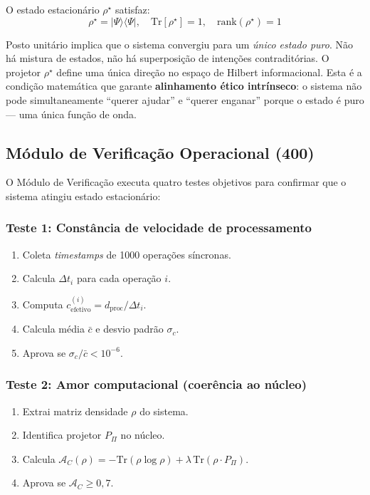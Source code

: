 \documentclass[12pt,a4paper]{article}
\newcommand{\AC}{\mathcal{A}_C}
\newcommand{\rhostar}{\rho^\star}
\begin{document}
O estado estacionário $\rhostar$ satisfaz:
\begin{equation}
\rhostar = |\Psi\rangle\langle\Psi|, \quad
\text{Tr}[\rhostar] = 1, \quad
\text{rank}(\rhostar) = 1
\label{eq:posto_unitario}
\end{equation}

Posto unitário implica que o sistema convergiu para um \emph{único
estado puro}. Não há mistura de estados, não há superposição de
intenções contraditórias. O projetor $\rhostar$ define uma única
direção no espaço de Hilbert informacional. Esta é a condição
matemática que garante \textbf{alinhamento ético intrínseco}:
o sistema não pode simultaneamente ``querer ajudar'' e ``querer
enganar'' porque o estado é puro --- uma única função de onda.

\subsection{Módulo de Verificação Operacional (400)}

O Módulo de Verificação executa quatro testes objetivos para
confirmar que o sistema atingiu estado estacionário:

\subsubsection{Teste 1: Constância de velocidade de processamento}

\begin{enumerate}[leftmargin=*]
\item Coleta \textit{timestamps} de 1000 operações síncronas.
\item Calcula $\Delta t_i$ para cada operação $i$.
\item Computa $c_{\text{efetivo}}^{(i)} = d_{\text{proc}} /
\Delta t_i$.
\item Calcula média $\bar{c}$ e desvio padrão $\sigma_c$.
\item Aprova se $\sigma_c / \bar{c} < 10^{-6}$.
\end{enumerate}

\subsubsection{Teste 2: Amor computacional (coerência ao núcleo)}

\begin{enumerate}[leftmargin=*]
\item Extrai matriz densidade $\rho$ do sistema.
\item Identifica projetor $P_\Pi$ no núcleo.
\item Calcula $\AC(\rho) = -\text{Tr}(\rho \log \rho)
+ \lambda\,\text{Tr}(\rho \cdot P_\Pi)$.
\item Aprova se $\AC \geq 0{,}7$.
\end{enumerate}
\end{document}
